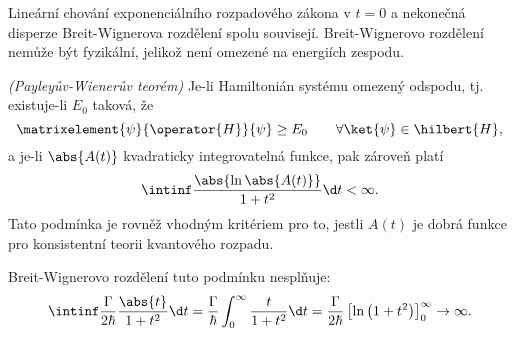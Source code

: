 \begin{solution}
\note
	Lineární chování exponenciálního rozpadového zákona v $t=0$ a nekonečná disperze Breit-Wignerova rozdělení spolu souvisejí.
	Breit-Wignerovo rozdělení nemůže být fyzikální, jelikož není omezené na energiích zespodu.

\note
	\emph{(Payleyův-Wienerův teorém)}	
	Je-li Hamiltonián systému omezený odspodu, tj. existuje-li $E_{0}$ taková, že
	\begin{equation}
		\matrixelement{\psi}{\operator{H}}{\psi}\geq E_{0}\qquad\forall\ket{\psi}\in\hilbert{H},
	\end{equation}
	a je-li $\abs{A(t)}$ kvadraticky integrovatelná funkce, pak zároveň platí
	\begin{equation}
		\intinf\frac{\abs{\ln{\abs{A(t)}}}}{1+t^{2}}\d t<\infty.
	\end{equation}
	Tato podmínka je rovněž vhodným kritériem pro to, jestli $A(t)$ je dobrá funkce pro konsistentní teorii kvantového rozpadu.
	
	Breit-Wignerovo rozdělení tuto podmínku nesplňuje:
	\begin{equation}
		\intinf\frac{\Gamma}{2\hbar}\frac{\abs{t}}{1+t^{2}}\d t
			=\frac{\Gamma}{\hbar}\int_{0}^{\infty}\frac{t}{1+t^{2}}\d t
			=\frac{\Gamma}{2\hbar}\left[\ln{\left(1+t^{2}\right)}\right]_{0}^{\infty}\rightarrow\infty.
	\end{equation}
\end{solution}
